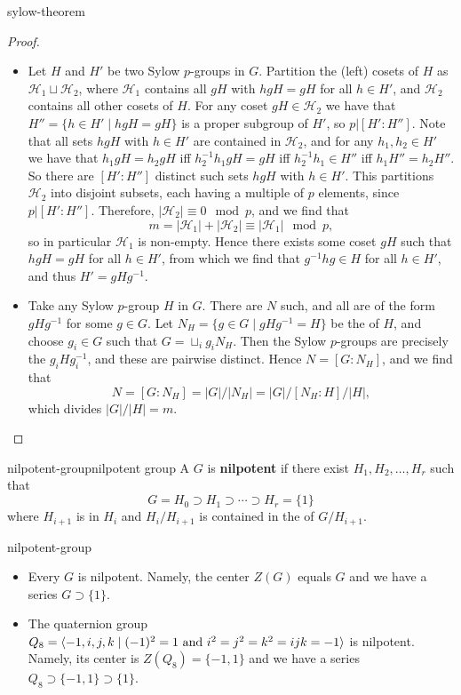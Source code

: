 \begin{example}{sylow-theorem}
\begin{proof}
\begin{itemize}
        \item Let $H$ and $H'$ be two Sylow $p$-groups in $G$. Partition the (left) cosets of $H$ as $\mathcal{H}_1 \sqcup \mathcal{H}_2$, where $\mathcal{H}_1$ contains all $gH$ with $hgH = gH$ for all $h \in H'$, and $\mathcal{H}_2$ contains all other cosets of $H$. For any coset $gH \in \mathcal{H}_2$ we have that $H'' = \{ h \in H' \mid hgH = gH \}$ is a proper subgroup of $H'$, so $p | [H' : H'']$. Note that all sets $hgH$ with $h \in H'$ are contained in $\mathcal{H}_2$, and for any $h_1, h_2 \in H'$ we have that $h_1 g H = h_2 g H$ iff $h_2^{-1} h_1 g H = g H$ iff $h_2^{-1} h_1 \in H''$ iff $h_1 H'' = h_2 H''$. So there are $[H' : H'']$ distinct such sets $hgH$ with $h \in H'$. This partitions $\mathcal{H}_2$ into disjoint subsets, each having a multiple of $p$ elements, since $p | [H' : H'']$. Therefore, $|\mathcal{H}_2| \equiv 0 \mod p$, and we find that
        \[ m = |\mathcal{H}_1| + |\mathcal{H}_2| \equiv |\mathcal{H}_1| \mod p , \]
        so in particular $\mathcal{H}_1$ is non-empty. Hence there exists some coset $gH$ such that $hgH = gH$ for all $h \in H'$, from which we find that $g^{-1}hg \in H$ for all $h \in H'$, and thus $H' = gHg^{-1}$.
        
        \item Take any Sylow $p$-group $H$ in $G$. There are $N$ such, and all are of the form $gHg^{-1}$ for some $g \in G$. Let $N_H = \{ g \in G \mid gHg^{-1} = H \}$ be the  of $H$, and choose $g_i \in G$ such that $G = \sqcup_i g_i N_H$. Then the Sylow $p$-groups are precisely the $g_i H g_i^{-1}$, and these are pairwise distinct. Hence $N = [G : N_H]$, and we find that
        \[ N = [G : N_H] = |G| / |N_H| = |G| / [N_H : H] / |H| , \]
        which divides $|G| / |H| = m$.
    \end{itemize}
    \end{proof}
\end{example}

\begin{topic}{nilpotent-group}{nilpotent group}
    A  $G$ is \textbf{nilpotent} if there exist  $H_1, H_2, \ldots, H_r$ such that
    \[ G = H_0 \supset H_1 \supset \cdots \supset H_r = \{ 1 \} \]
    where $H_{i + 1}$ is  in $H_i$ and $H_i/H_{i + 1}$ is contained in the  of $G/H_{i + 1}$.
\end{topic}

\begin{example}{nilpotent-group}
    \begin{itemize}
        \item Every  $G$ is nilpotent. Namely, the center $Z(G)$ equals $G$ and we have a series $G \supset \{ 1 \}$.
        \item The quaternion group $Q_8 = \langle -1, i, j, k \mid (-1)^2 = 1 \textup{ and } i^2 = j^2 = k^2 = ijk = -1 \rangle$ is nilpotent. Namely, its center is $Z(Q_8) = \{ -1, 1 \}$ and we have a series $Q_8 \supset \{ -1, 1 \} \supset \{ 1 \}$.
    \end{itemize}
\end{example}

